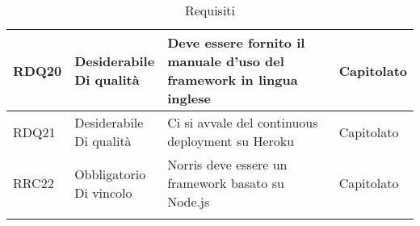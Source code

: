 \begin{longtabu}[c]{|X[0.7,l]|X[l]|X[2.5,l]|X[l]|}
                RDQ20 & 
                \parbox[t]{4cm}{ Desiderabile \\ Di qualità} & Deve essere fornito il manuale d'uso del framework in lingua inglese & \parbox[t]{4cm}{Capitolato }  \\ 
                \hline
                
                RDQ21 & 
                \parbox[t]{4cm}{ Desiderabile \\ Di qualità} & Ci si avvale del continuous deployment su Heroku & \parbox[t]{4cm}{Capitolato }  \\ 
                \hline
                
                RRC22 & 
                \parbox[t]{4cm}{ Obbligatorio \\ Di vincolo} & Norris deve essere un framework basato su Node.js & \parbox[t]{4cm}{Capitolato }  \\ 
                \hline
                                \caption{Requisiti}
				\end{longtabu}